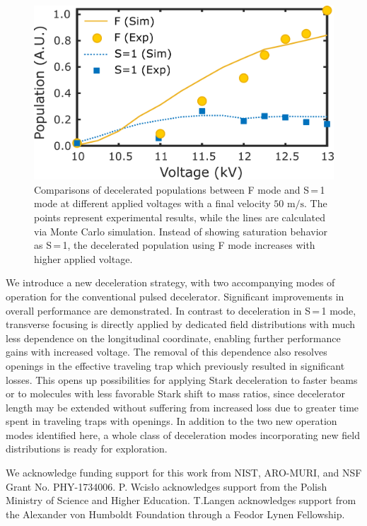 \documentclass[%
 reprint,
 amsmath,amssymb,
 aps,
prl,
]{revtex4-1}
\begin{document}
\begin{figure}[t]
\includegraphics[width=\linewidth]{Figure4.png}
\vspace{-15pt}
\caption{\label{fig:voltage}
Comparisons of decelerated populations between F mode and S\,=\,1 mode at different applied voltages with a final velocity $50 \text{ m/s}$. 
The points represent experimental results, while the lines are calculated via Monte Carlo simulation. 
Instead of showing saturation behavior as S\,=\,1, the decelerated population using F mode increases with higher applied voltage.
\vspace{-15pt}}
\end{figure}

We introduce a new deceleration strategy, with two accompanying modes of operation for the conventional pulsed decelerator. 
Significant improvements in overall performance are demonstrated.
In contrast to deceleration in S\,=\,1 mode, transverse focusing is directly applied by dedicated field distributions with much less dependence on the longitudinal coordinate, enabling further performance gains with increased voltage.
The removal of this dependence also resolves openings in the effective traveling trap which previously resulted in significant losses.
This opens up possibilities for applying Stark deceleration to faster beams or to molecules with less favorable Stark shift to mass ratios, since decelerator length may be extended without suffering from increased loss due to greater time spent in traveling traps with openings.
In addition to the two new operation modes identified here, a whole class of deceleration modes incorporating new field distributions is ready for exploration.

We acknowledge funding support for this work from NIST, ARO-MURI, and NSF Grant No. PHY-1734006. 
P. Wcis\l o acknowledges support from the Polish Ministry of Science and Higher Education. 
T.Langen acknowledges support from the Alexander von Humboldt Foundation through a Feodor Lynen Fellowship.




\end{document}
